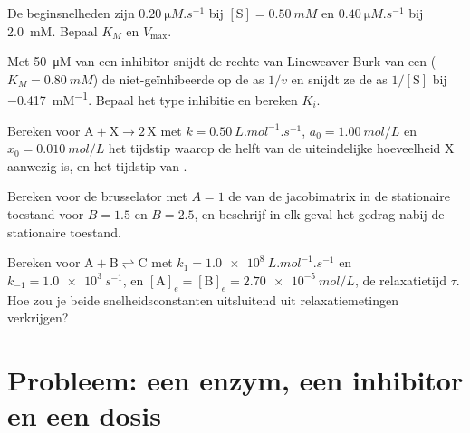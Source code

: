 \begin{exercise}[$\star\star$]\label{exo:b3:complex-kinetics:8}
De beginsnelheden zijn $\qty{0.20}{\micro M.s^{-1}}$ bij $[\mathrm S] = \qty{0.50}{mM}$ en $\qty{0.40}{\micro M.s^{-1}}$ bij
\qty{2.0}{mM}. Bepaal $K_M$ en $V_{\max}$.
\end{exercise}

\begin{exercise}[$\star\star$]\label{exo:b3:complex-kinetics:9}
Met \qty{50}{\micro M} van een inhibitor snijdt de rechte van
Lineweaver-Burk van een 
($K_M = \qty{0.80}{mM}$) de niet-geïnhibeerde op de as $1/v$ en snijdt ze de
as $1/[\mathrm S]$ bij \qty{-0.417}{mM^{-1}}. Bepaal het type inhibitie en bereken $K_i$.
\end{exercise}

\begin{exercise}[$\star\star\star$]\label{exo:b3:complex-kinetics:10}
Bereken voor $\mathrm{A + X \to 2\,X}$ met $k = \qty{0.50}{L.mol^{-1}.s^{-1}}$, $a_0 = \qty{1.00}{mol/L}$ en $x_0 = \qty{0.010}{mol/L}$
het tijdstip waarop de helft van de uiteindelijke hoeveelheid X aanwezig
is, en het tijdstip van .
\end{exercise}

\begin{exercise}[$\star\star\star$]\label{exo:b3:complex-kinetics:11}
Bereken voor de brusselator met $A = 1$ de  van de
jacobimatrix in de stationaire toestand voor $B = 1.5$ en $B = 2.5$, en
beschrijf in elk geval het gedrag nabij de stationaire toestand.
\end{exercise}

\begin{exercise}[$\star\star\star$]\label{exo:b3:complex-kinetics:12}
Bereken voor $\mathrm{A + B \rightleftharpoons C}$ met $k_1 = \qty{1.0e8}{L.mol^{-1}.s^{-1}}$ en $k_{-1} = \qty{1.0e3}{s^{-1}}$, en
$[\mathrm A]_e = [\mathrm B]_e = \qty{2.70e-5}{mol/L}$, de relaxatietijd $\tau$. Hoe zou je beide snelheidsconstanten
uitsluitend uit relaxatiemetingen verkrijgen?
\end{exercise}

\section{Probleem: een enzym, een inhibitor en een dosis}

